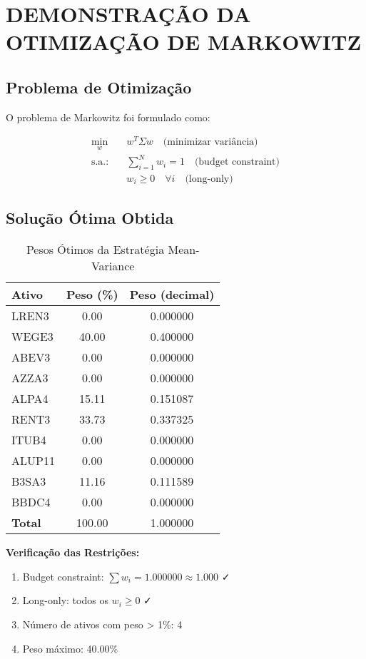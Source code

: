 \section{DEMONSTRAÇÃO DA OTIMIZAÇÃO DE MARKOWITZ}

\subsection{Problema de Otimização}

O problema de Markowitz foi formulado como:

\begin{align}
\min_{w} \quad & w^T \Sigma w \quad \text{(minimizar variância)} \\
\text{s.a.:} \quad & \sum_{i=1}^{N} w_i = 1 \quad \text{(budget constraint)} \\
& w_i \geq 0 \quad \forall i \quad \text{(long-only)}
\end{align}

\subsection{Solução Ótima Obtida}

\begin{table}[H]
\centering
\caption{Pesos Ótimos da Estratégia Mean-Variance}
\begin{tabular}{|l|c|c|}
\hline
\textbf{Ativo} & \textbf{Peso (\%)} & \textbf{Peso (decimal)} \\
\hline
LREN3 & 0.00 & 0.000000 \\
WEGE3 & 40.00 & 0.400000 \\
ABEV3 & 0.00 & 0.000000 \\
AZZA3 & 0.00 & 0.000000 \\
ALPA4 & 15.11 & 0.151087 \\
RENT3 & 33.73 & 0.337325 \\
ITUB4 & 0.00 & 0.000000 \\
ALUP11 & 0.00 & 0.000000 \\
B3SA3 & 11.16 & 0.111589 \\
BBDC4 & 0.00 & 0.000000 \\
\hline
\textbf{Total} & 100.00 & 1.000000 \\
\hline
\end{tabular}
\end{table}

\textbf{Verificação das Restrições:}
\begin{enumerate}
    \item Budget constraint: $\sum w_i = 1.000000 \approx 1.000$ ✓
    \item Long-only: todos os $w_i \geq 0$ ✓
    \item Número de ativos com peso > 1\%: 4
    \item Peso máximo: 40.00\%
\end{enumerate}

